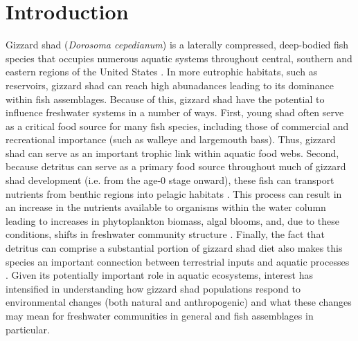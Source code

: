 \documentclass[preprint,review,12pt,authoryear]{elsarticle}
\begin{document}
\section{Introduction}
Gizzard shad (\emph{Dorosoma cepedianum}) is a laterally compressed, deep-bodied fish species that occupies numerous aquatic systems throughout central, southern and eastern regions of the United States \citep{pierce1981aspects,vanni2005linking}.  
In more eutrophic habitats, such as reservoirs, gizzard shad can reach high abunadances leading to its dominance within fish assemblages. 
Because of this, gizzard shad have the potential to influence freshwater systems in a number of ways. 
First, young shad often serve as a critical food source for many fish species, including those of commercial and recreational importance (such as walleye and largemouth bass)\citep{jester1972life}. 
Thus, gizzard shad can serve as an important trophic link within aquatic food webs.
Second, because detritus can serve as a primary food source throughout much of gizzard shad development (i.e. from the age-0 stage onward), these fish can transport nutrients
from benthic regions into pelagic habitats \citep{mather1995regeneration, schaus2000effects, vanni2005linking}. 
This process can result in an increase in the nutrients available to organisms within the water column leading to increases in phytoplankton biomass, algal blooms, and, due to these conditions, shifts in freshwater community structure \citep{aday2003direct, schaus2000effects}. 
Finally, the fact that detritus can comprise a substantial portion of gizzard shad diet also makes this species an important connection between terrestrial inputs and aquatic processes \citep{schaus2000effects}.
Given its potentially important role in aquatic ecosystems, interest has intensified in understanding how gizzard shad populations respond to environmental changes (both natural and anthropogenic) and what these changes may mean for freshwater communities in general and fish assemblages in particular.
\end{document}
